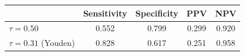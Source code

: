 \documentclass[border=10pt]{standalone}
\begin{document}
\begin{tabular}{lcccc}
\toprule
 & \textbf{Sensitivity} & \textbf{Specificity} & \textbf{PPV} & \textbf{NPV} \\
\midrule
$\tau = 0.50$          & 0.552 & 0.799 & 0.299 & 0.920 \\
$\tau = 0.31$ (Youden) & 0.828 & 0.617 & 0.251 & 0.958 \\
\bottomrule
\end{tabular}
\end{document}
